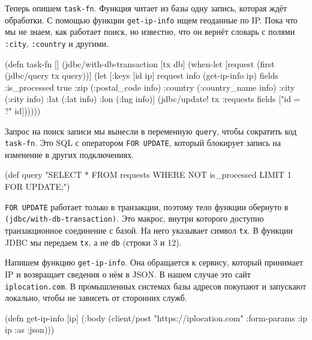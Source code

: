 Теперь опишем \verb|task-fn|. Функция читает из базы одну запись, которая
ждёт обработки. С помощью функции \verb|get-ip-info| ищем геоданные по
IP. Пока что мы не знаем, как работает поиск, но известно, что он вернёт словарь
с полями \verb|:city|, \verb|:country| и другими.


\begin{english}
  \begin{clojure/lines}
(defn task-fn []
  (jdbc/with-db-transaction [tx db]
    (when-let [request (first (jdbc/query tx query))]
      (let [{:keys [id ip]} request
            info   (get-ip-info ip)
            fields {:is_processed true
                    :zip (:postal_code info)
                    :country (:country_name info)
                    :city (:city info)
                    :lat (:lat info)
                    :lon (:lng info)}]
        (jdbc/update! tx :requests
                      fields
                      ["id = ?" id])))))
  \end{clojure/lines}
\end{english}


Запрос на поиск записи мы вынесли в переменную \verb|query|, чтобы сократить
код \verb|task-fn|. Это SQL с оператором \verb|FOR UPDATE|, который
блокирует запись на изменение в других подключениях.

\begin{english}
  \begin{clojure}
(def query
  "SELECT * FROM requests
   WHERE NOT is_processed
   LIMIT 1 FOR UPDATE;")
  \end{clojure}
\end{english}

\verb|FOR UPDATE| работает только в транзакции, поэтому тело функции обернуто
в \verb|(jdbc/with-db-transaction)|. Это макрос, внутри которого доступно
транзакционное соединение с базой. На него указывает символ \verb|tx|. В
функции JDBC мы передаем \verb|tx|, а не \verb|db| (строки 3 и 12).


Напишем функцию \verb|get-ip-info|. Она обращается к сервису, который
принимает IP и возвращает сведения о нём в JSON. В нашем случае это сайт
\verb|iplocation.com|. В промышленных системах базы адресов покупают и
запускают локально, чтобы не зависеть от сторонних служб.

\begin{english}
  \begin{clojure}
(defn get-ip-info [ip]
  (:body (client/post "https://iplocation.com"
                      {:form-params {:ip ip}
                       :as :json})))
  \end{clojure}
\end{english}

